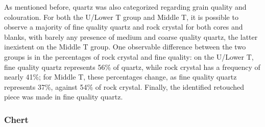\documentclass[12pt,twoside]{reedthesis}
\begin{document}
As mentioned before, quartz was also categorized regarding grain quality and colouration. For both the U/Lower T group and Middle T, it is possible to observe a majority of fine quality quartz and rock crystal for both cores and blanks, with barely any presence of medium and coarse quality quartz, the latter inexistent on the Middle T group. One observable difference between the two groups is in the percentages of rock crystal and fine quality: on the U/Lower T, fine quality quartz represents 56\% of quartz, while rock crystal has a frequency of nearly 41\%; for Middle T, these percentages change, as fine quality quartz represents 37\%, against 54\% of rock crystal. Finally, the identified retouched piece was made in fine quality quartz.
\begin{table}

\caption{\label{tab:quartzqualityTG}Quartz quality by class (Terminal Gravettian).}
\centering
{}
\end{table}
\begin{table}

\caption{\label{tab:quartzqualityPR}Quartz quality by class (Middle T).}
\centering
{}
\end{table}
\hypertarget{chert-1}{%
\subsubsection{Chert}\label{chert-1}}
\end{document}
